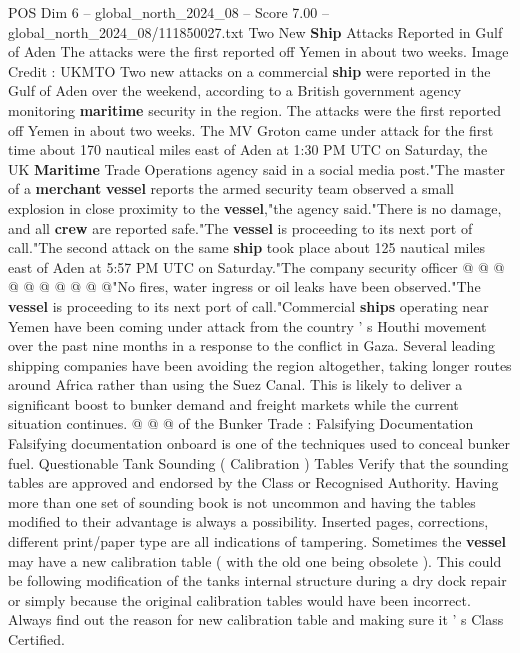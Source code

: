 \begin{textsample}{POS Dim 6 – global\_north\_2024\_08 – Score 7.00 – global\_north\_2024\_08/111850027.txt}  \label{ex:f6_pos_294}
Two New \textbf{Ship} Attacks Reported in Gulf of Aden The attacks were the first reported off Yemen in about two weeks.
Image Credit : UKMTO Two new attacks on a commercial \textbf{ship} were reported in the Gulf of Aden over the weekend, according to a British government agency monitoring \textbf{maritime} security in the region.
The attacks were the first reported off Yemen in about two weeks.
The MV Groton came under attack for the first time about 170 nautical miles east of Aden at 1:30 PM UTC on Saturday, the UK \textbf{Maritime} Trade Operations agency said in a social media post."The master of a \textbf{merchant} \textbf{vessel} reports the armed security team observed a small explosion in close proximity to the \textbf{vessel},"the agency said."There is no damage, and all \textbf{crew} are reported safe."The \textbf{vessel} is proceeding to its next port of call."The second attack on the same \textbf{ship} took place about 125 nautical miles east of Aden at 5:57 PM UTC on Saturday."The company security officer @ @ @ @ @ @ @ @ @ @"No fires, water ingress or oil leaks have been observed."The \textbf{vessel} is proceeding to its next port of call."Commercial \textbf{ships} operating near Yemen have been coming under attack from the country ' s Houthi movement over the past nine months in a response to the conflict in Gaza.
Several leading shipping companies have been avoiding the region altogether, taking longer routes around Africa rather than using the Suez Canal.
This is likely to deliver a significant boost to bunker demand and freight markets while the current situation continues. @ @ @ of the Bunker Trade : Falsifying Documentation Falsifying documentation onboard is one of the techniques used to conceal bunker fuel.
Questionable Tank Sounding ( Calibration ) Tables Verify that the sounding tables are approved and endorsed by the Class or Recognised Authority.
Having more than one set of sounding book is not uncommon and having the tables modified to their advantage is always a possibility.
Inserted pages, corrections, different print/paper type are all indications of tampering.
Sometimes the \textbf{vessel} may have a new calibration table ( with the old one being obsolete ).
This could be following modification of the tanks internal structure during a dry dock repair or simply because the original calibration tables would have been incorrect.
Always find out the reason for new calibration table and making sure it ' s Class Certified.

\end{textsample}
